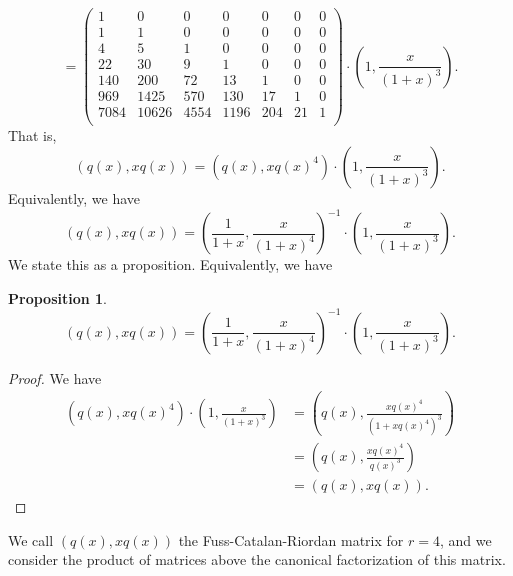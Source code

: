 \documentclass[12pt,reqno]{article}
\newtheorem{proposition}[theorem]{Proposition}
\theoremstyle{definition}
\begin{document}
$$=\left(
\begin{array}{ccccccc}
1& 0 & 0 & 0 & 0 & 0 & 0 \\
1 & 1 & 0 & 0 & 0 & 0 & 0 \\
4 & 5 & 1 & 0 & 0 & 0 & 0 \\
22 & 30 & 9 & 1 & 0 & 0 & 0 \\
140 & 200 & 72 & 13 & 1 & 0 & 0 \\
969 & 1425 & 570 & 130 & 17 & 1 & 0 \\
7084 & 10626 & 4554 & 1196 & 204 & 21 & 1 \\
\end{array}\right) \cdot \left(1, \frac{x}{(1+x)^3}\right).$$ That is,
$$(q(x), xq(x))= (q(x), x q(x)^4) \cdot  \left(1, \frac{x}{(1+x)^3}\right).$$
Equivalently, we have
$$(q(x), xq(x))=\left(\frac{1}{1+x}, \frac{x}{(1+x)^4}\right)^{-1} \cdot  \left(1, \frac{x}{(1+x)^3}\right).$$ We state this as a proposition.
Equivalently, we have
\begin{proposition}
$$(q(x), xq(x))=\left(\frac{1}{1+x}, \frac{x}{(1+x)^4}\right)^{-1} \cdot  \left(1, \frac{x}{(1+x)^3}\right).$$
\end{proposition}
\begin{proof}
We have
\begin{align*}
(q(x), xq(x)^4)\cdot \left(1,\frac{x}{(1+x)^3}\right)&=\left(q(x), \frac{xq(x)^4}{(1+xq(x)^4)^3}\right)\\
&=\left(q(x), \frac{xq(x)^4}{q(x)^3}\right)\\
&=(q(x), xq(x)).\end{align*}
\end{proof}
We call $(q(x), xq(x))$ the Fuss-Catalan-Riordan matrix for $r=4$, and we consider the product of matrices above the canonical factorization of this matrix.
\end{document}
